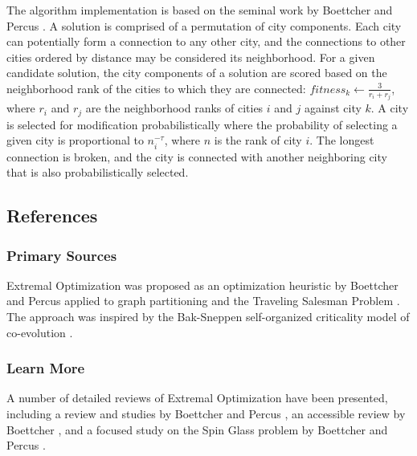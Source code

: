 The algorithm implementation is based on the seminal work by Boettcher and Percus \cite{Boettcher1999}. A solution is comprised of a permutation of city components. Each city can potentially form a connection to any other city, and the connections to other cities ordered by distance may be considered its neighborhood. For a given candidate solution, the city components of a solution are scored based on the neighborhood rank of the cities to which they are connected: $fitness_k \leftarrow \frac{3}{r_i + r_j}$, where $r_i$ and $r_j$ are the neighborhood ranks of cities $i$ and $j$ against city $k$. A city is selected for modification probabilistically where the probability of selecting a given city is proportional to $n_i^{-\tau}$, where $n$ is the rank of city $i$. The longest connection is broken, and the city is connected with another neighboring city that is also probabilistically selected.



\subsection{References}

% 
% 
\subsubsection{Primary Sources}
Extremal Optimization was proposed as an optimization heuristic by Boettcher and Percus applied to graph partitioning and the Traveling Salesman Problem \cite{Boettcher1999}. The approach was inspired by the Bak-Sneppen self-organized criticality model of co-evolution \cite{Bak1987, Bak1993}.

% 
% 
\subsubsection{Learn More}
A number of detailed reviews of Extremal Optimization have been presented, including a review and studies by Boettcher and Percus \cite{Boettcher2000}, an accessible review by Boettcher \cite{Boettcher2000a}, and a focused study on the Spin Glass problem by Boettcher and Percus \cite{Boettcher2001}.


